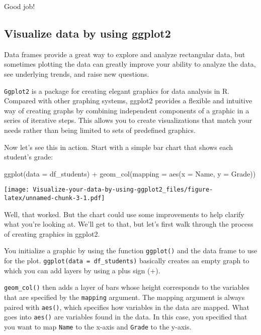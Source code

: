 \documentclass[
]{article}
\newenvironment{Shaded}{\begin{snugshade}}{\end{snugshade}}
\newcommand{\AttributeTok}[1]{\textcolor[rgb]{0.77,0.63,0.00}{#1}}
\newcommand{\FunctionTok}[1]{\textcolor[rgb]{0.00,0.00,0.00}{#1}}
\newcommand{\NormalTok}[1]{#1}
\newcommand{\SpecialCharTok}[1]{\textcolor[rgb]{0.00,0.00,0.00}{#1}}
\begin{document}
Good job!

\hypertarget{visualize-data-by-using-ggplot2}{%
\subsection{Visualize data by using
ggplot2}\label{visualize-data-by-using-ggplot2}}

Data frames provide a great way to explore and analyze rectangular data,
but sometimes plotting the data can greatly improve your ability to
analyze the data, see underlying trends, and raise new questions.

\texttt{Ggplot2} is a package for creating elegant graphics for data
analysis in R. Compared with other graphing systems, ggplot2 provides a
flexible and intuitive way of creating graphs by combining independent
components of a graphic in a series of iterative steps. This allows you
to create visualizations that match your needs rather than being limited
to sets of predefined graphics.

Now let's see this in action. Start with a simple bar chart that shows
each student's grade:

\begin{Shaded}
\begin{Highlighting}[]
\FunctionTok{ggplot}\NormalTok{(}\AttributeTok{data =}\NormalTok{ df\_students) }\SpecialCharTok{+}
  \FunctionTok{geom\_col}\NormalTok{(}\AttributeTok{mapping =} \FunctionTok{aes}\NormalTok{(}\AttributeTok{x =}\NormalTok{ Name, }\AttributeTok{y =}\NormalTok{ Grade))}
\end{Highlighting}
\end{Shaded}

\texttt{[image: Visualize-your-data-by-using-ggplot2\_files/figure-latex/unnamed-chunk-3-1.pdf]}

Well, that worked. But the chart could use some improvements to help
clarify what you're looking at. We'll get to that, but let's first walk
through the process of creating graphics in ggplot2.

You initialize a graphic by using the function \texttt{ggplot()} and the
data frame to use for the plot. \texttt{ggplot(data\ =\ df\_students)}
basically creates an empty graph to which you can add layers by using a
plus sign (+).

\texttt{geom\_col()} then adds a layer of bars whose height corresponds
to the variables that are specified by the \texttt{mapping} argument.
The mapping argument is always paired with \texttt{aes()}, which
specifies how variables in the data are mapped. What goes into
\texttt{aes()} are variables found in the data. In this case, you
specified that you want to map \texttt{Name} to the x-axis and
\texttt{Grade} to the y-axis.
\end{document}
